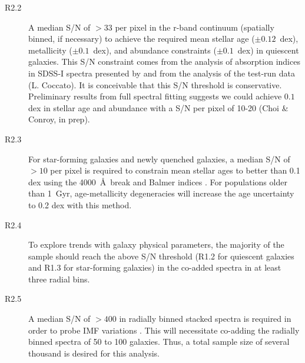 \documentclass[preprint,11pt]{aastex}
\begin{document}
\begin{description}
 \item[R2.2] A median S/N of $>33$ per pixel in the r-band continuum
   (spatially binned, if necessary) to achieve the required mean
   stellar age ($\pm0.12$~dex), metallicity ($\pm0.1$~dex), and
   abundance constraints ($\pm0.1$~dex) in quiescent galaxies. This
   S/N constraint comes from the analysis of absorption indices in
   SDSS-I spectra presented by \cite{johansson12} and from the
   analysis of the test-run data (L. Coccato).  It is conceivable that
   this S/N threshold is conservative. Preliminary results from full
   spectral fitting suggests we could achieve $0.1$ dex in stellar age
   and abundance with a S/N per pixel of 10-20 (Choi \& Conroy, in
   prep).
   

 \item[R2.3] For star-forming galaxies and newly quenched galaxies, a
   median S/N of $>10$ per pixel is required to constrain mean stellar
   ages to better than 0.1 dex using the 4000~\AA\ break and Balmer
   indices \citep{kauffmann03a}.  For populations older than 1~Gyr,
   age-metallicity degeneracies will increase the age uncertainty to 0.2
   dex with this method.


 \item[R2.4] To explore trends with galaxy physical parameters, the
   majority of the sample should reach the above S/N threshold (R1.2
   for quiescent galaxies and R1.3 for star-forming galaxies) in the
   co-added spectra in at least three radial bins.

\item[R2.5] A median S/N of $>400$ in radially binned stacked spectra
  is required in order to probe IMF variations \citep{ferreras2013}.
  This will necessitate co-adding the radially binned spectra of 50 to
  100 galaxies.  Thus, a total sample size of several thousand is desired
  for this analysis.

\end{description}
\end{document}
